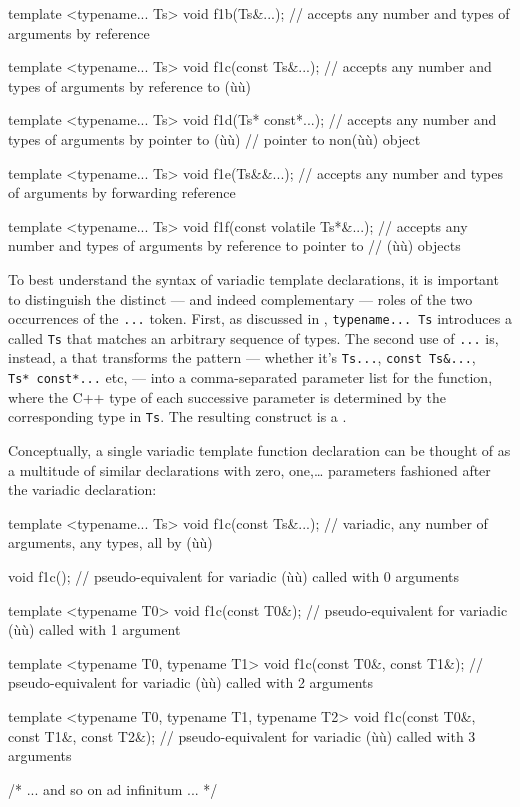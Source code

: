 \begin{emcppslisting}
template <typename... Ts> void f1b(Ts&...);
   // accepts any number and types of arguments by reference

template <typename... Ts> void f1c(const Ts&...);
   // accepts any number and types of arguments by reference to (ù{}ù)

template <typename... Ts> void f1d(Ts* const*...);
   // accepts any number and types of arguments by pointer to (ù{}ù)
   // pointer to non(ù{}ù) object

template <typename... Ts> void f1e(Ts&&...);
   // accepts any number and types of arguments by forwarding reference

template <typename... Ts> void f1f(const volatile Ts*&...);
   // accepts any number and types of arguments by reference to pointer to
   // (ù{}ù) objects
\end{emcppslisting}
    

\noindent To best understand the syntax of variadic template declarations, it is
important to distinguish the distinct --- and indeed complementary ---
roles of the two occurrences of the \lstinline!...! token. First, as
discussed in ,
\lstinline!typename...!~\lstinline!Ts! introduces a  called \lstinline!Ts! that matches an arbitrary sequence of types.
The second use of \lstinline!...! is, instead, a 
that transforms the pattern --- whether it's \lstinline!Ts...!,
\lstinline!const!~\lstinline!Ts&...!, \lstinline!Ts*!~\lstinline!const*...! etc,
--- into a comma-separated parameter list for the function, where the
C++ type of each successive parameter is determined by the corresponding
type in \lstinline!Ts!. The resulting construct is a .

Conceptually, a single variadic template function declaration can be
thought of as a multitude of similar declarations with zero,
one,\ldots{} parameters fashioned after the variadic declaration:

\begin{emcppslisting}
template <typename... Ts> void f1c(const Ts&...);
    // variadic, any number of arguments, any types, all by (ù{}ù)

void f1c();
    // pseudo-equivalent for variadic (ù{}ù) called with 0 arguments

template <typename T0> void f1c(const T0&);
    // pseudo-equivalent for variadic (ù{}ù) called with 1 argument

template <typename T0, typename T1>
void f1c(const T0&, const T1&);
    // pseudo-equivalent for variadic (ù{}ù) called with 2 arguments

template <typename T0, typename T1, typename T2>
void f1c(const T0&, const T1&, const T2&);
    // pseudo-equivalent for variadic (ù{}ù) called with 3 arguments

/* ... and so on ad infinitum ... */
\end{emcppslisting}
    


